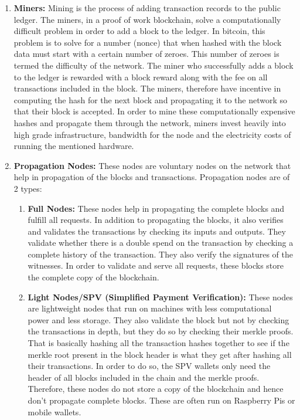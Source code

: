 \begin{enumerate}
    \item \textbf{Miners:} Mining is the process of adding transaction records
        to the public ledger. The miners, in a proof of work blockchain, solve a
        computationally difficult problem in order to add a block to the ledger.
        In bitcoin, this problem is to solve for a number (nonce) \citep{nonce} that when
        hashed with the block data must start with a certain number of zeroes.
        This number of zeroes is termed the difficulty of the network. The miner
        who successfully adds a block to the ledger is rewarded with a block
        reward along with the fee on all transactions included in the block. The
        miners, therefore have incentive in computing the hash for the next
        block and propagating it to the network so that their block is accepted.
        In order to mine these computationally expensive hashes and propagate
        them through the network, miners invest heavily into high grade
        infrastructure, bandwidth for the node and the electricity costs of
        running the mentioned hardware.

    \item \textbf{Propagation Nodes:} These nodes are voluntary nodes on the
        network that help in propagation of the blocks and transactions.
        Propagation nodes are of 2 types:

        \begin{enumerate}
            \item \textbf{Full Nodes:}
                These nodes help in propagating the complete blocks and fulfill
                all requests. In addition to propagating the blocks, it also
                verifies and validates the transactions by checking its inputs
                and outputs. They validate whether there is a double spend on
                the transaction by checking a complete history of the
                transaction. They also verify the signatures of the witnesses.
                In order to validate and serve all requests, these blocks store
                the complete copy of the blockchain.

            \item \textbf{Light Nodes/SPV (Simplified Payment Verification):} 
                These nodes are lightweight nodes that run on machines with
                less computational power and less storage. They also validate
                the block but not by checking the transactions in depth, but
                they do so by checking their merkle proofs.  That is basically
                hashing all the transaction hashes together to see if the
                merkle root \citep{invest-merkle} present in the block header
                is what they get after hashing all their transactions. In order
                to do so, the SPV wallets only need the header of all blocks
                included in the chain and the merkle proofs. Therefore, these
                nodes do not store a copy of the blockchain and hence don’t
                propagate complete blocks. These are often run on Raspberry Pis
                or mobile wallets. 


\end{enumerate}
\end{enumerate}
